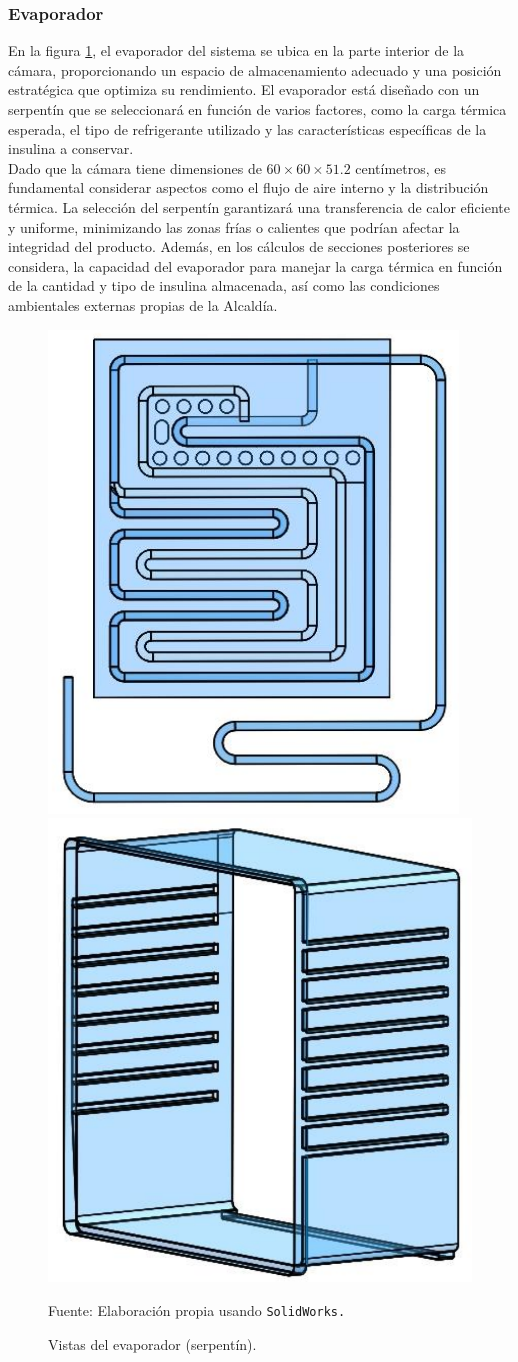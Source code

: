  \subsubsection{Evaporador}
 
 
En la figura \ref{fig:4-evaporator}, el evaporador del sistema se ubica en la parte interior de la cámara, proporcionando un espacio de almacenamiento adecuado y una posición estratégica que optimiza su rendimiento. El evaporador está diseñado con un serpentín que se seleccionará en función de varios factores, como la carga térmica esperada, el tipo de refrigerante utilizado y las características específicas de la insulina a conservar. \\
Dado que la cámara tiene dimensiones de $60\times 60 \times 51{.}2$ centímetros, es fundamental considerar aspectos como el flujo de aire interno y la distribución térmica. La selección del serpentín garantizará una transferencia de calor eficiente y uniforme, minimizando las zonas frías o calientes que podrían afectar la integridad del producto. Además, en los cálculos de secciones posteriores se considera, la capacidad del evaporador para manejar la carga térmica en función de la cantidad y tipo de insulina almacenada, así como las condiciones ambientales externas propias de la Alcaldía. 
 \begin{figure}[H]
 	\centering
 	\includegraphics[width=0.4\linewidth]{figures/4-evaporator}\includegraphics[width=0.4\linewidth]{figures/4-evaporator2}
 	\caption{Vistas del evaporador (serpentín).}
 	Fuente: Elaboración propia usando \texttt{SolidWorks.}
 	\label{fig:4-evaporator}
 \end{figure}\rsp 
 
